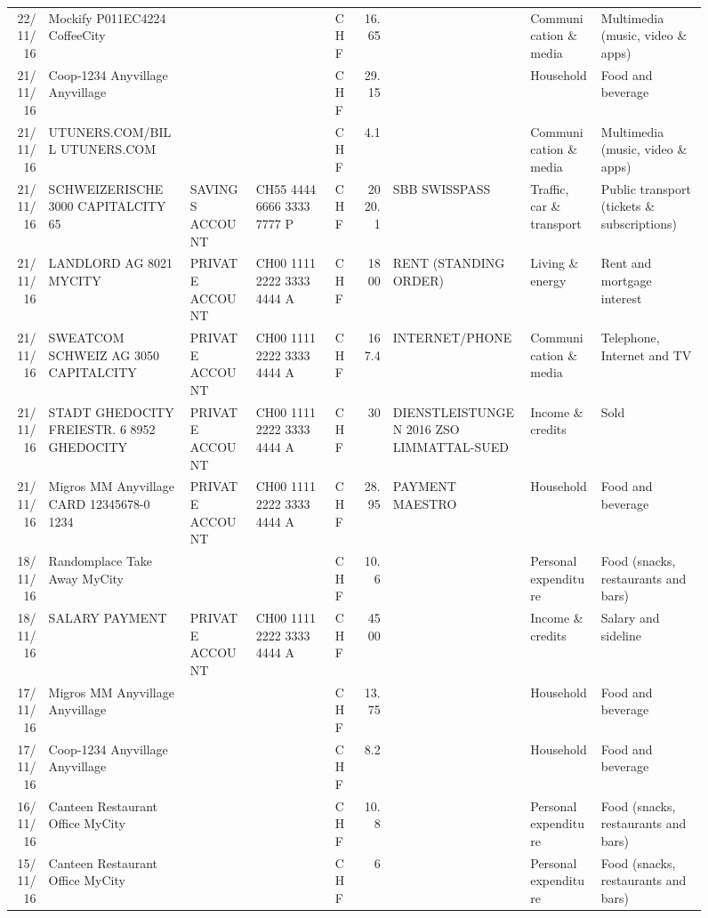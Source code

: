 \begin{landscape}
\begin{sidewaysfigure}
\begin{table}[h]
\begin{center}
\begin{tabular}{rllllrlll}
		22/11/16 & Mockify P011EC4224       CoffeeCity &       &       & CHF   & 16.65 &       & Communication \& media & Multimedia (music, video \& apps) \\
		21/11/16 & Coop-1234 Anyvillage    Anyvillage &       &       & CHF   & 29.15 &       & Household & Food and beverage \\
		21/11/16 & UTUNERS.COM/BILL          UTUNERS.COM &       &       & CHF   & 4.1   &       & Communication \& media & Multimedia (music, video \& apps) \\
		21/11/16 & SCHWEIZERISCHE 3000 CAPITALCITY 65 & SAVINGS ACCOUNT & CH55 4444 6666 3333 7777 P & CHF   & 2020.1 & SBB SWISSPASS & Traffic, car \& transport & Public transport (tickets \& subscriptions) \\
		21/11/16 & LANDLORD AG 8021 MYCITY & PRIVATE ACCOUNT & CH00 1111 2222 3333 4444 A & CHF   & 1800  & RENT (STANDING ORDER) & Living \& energy & Rent and mortgage interest \\
		21/11/16 & SWEATCOM SCHWEIZ AG 3050 CAPITALCITY & PRIVATE ACCOUNT & CH00 1111 2222 3333 4444 A & CHF   & 167.4 & INTERNET/PHONE & Communication \& media & Telephone,  Internet and TV \\
		21/11/16 & STADT GHEDOCITY FREIESTR. 6 8952 GHEDOCITY & PRIVATE ACCOUNT & CH00 1111 2222 3333 4444 A & CHF   & 30    & DIENSTLEISTUNGEN 2016      ZSO LIMMATTAL-SUED & Income \& credits & Sold \\
		21/11/16 & Migros MM Anyvillage CARD 12345678-0 1234 & PRIVATE ACCOUNT & CH00 1111 2222 3333 4444 A & CHF   & 28.95 & PAYMENT MAESTRO & Household & Food and beverage \\
		18/11/16 & Randomplace Take Away     MyCity &       &       & CHF   & 10.6  &       & Personal expenditure & Food (snacks, restaurants and bars) \\
		18/11/16 & SALARY PAYMENT & PRIVATE ACCOUNT & CH00 1111 2222 3333 4444 A & CHF   & 4500  &       & Income \& credits & Salary and sideline \\
		17/11/16 & Migros MM Anyvillage    Anyvillage &       &       & CHF   & 13.75 &       & Household & Food and beverage \\
		17/11/16 & Coop-1234 Anyvillage    Anyvillage &       &       & CHF   & 8.2   &       & Household & Food and beverage \\
		16/11/16 & Canteen Restaurant Office      MyCity &       &       & CHF   & 10.8  &       & Personal expenditure & Food (snacks, restaurants and bars) \\
		15/11/16 & Canteen Restaurant Office      MyCity &       &       & CHF   & 6     &       & Personal expenditure & Food (snacks, restaurants and bars) \\

\end{tabular}
\end{center}
\end{table}
\end{sidewaysfigure}
\end{landscape}
